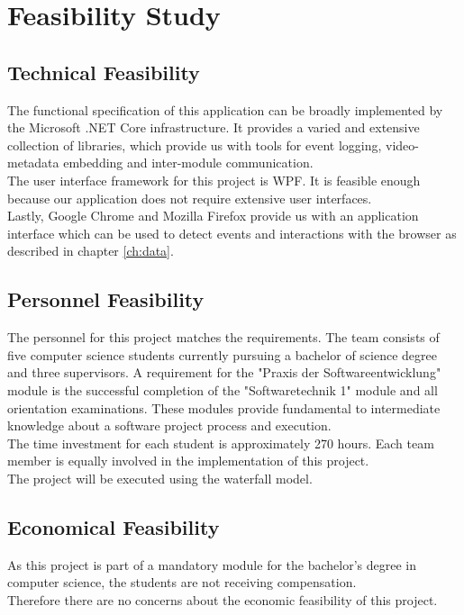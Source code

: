 \chapter{Feasibility Study}
\label{ch:feasibility}

\section{Technical Feasibility}
\label{Technical Feasibility}
The functional specification of this application can be broadly implemented by the Microsoft .NET Core infrastructure. It provides a varied and extensive collection of libraries, which provide us with tools for \gls{event} logging, video-metadata embedding and inter-module communication.\\
The user interface framework for this project is WPF. It is feasible enough because our application does not require extensive user interfaces.\\
Lastly, Google Chrome and Mozilla Firefox provide us with an application interface which can be used to detect \glspl{event} and interactions with the \gls{browser} as described in chapter \ref{ch:data}.

\section{Personnel Feasibility}
\label{Personnel Feasibility}
The personnel for this project matches the requirements. The team consists of five computer science students currently pursuing a bachelor of science degree and three supervisors. A requirement for the "Praxis der Softwareentwicklung" module is the successful completion of the "Softwaretechnik 1" module and all orientation examinations. These modules provide fundamental to intermediate knowledge about a software project process and execution.\\
The time investment for each student is approximately 270 hours. Each team member is equally involved in the implementation of this project.\\
The project will be executed using the waterfall model.

\section{Economical Feasibility}
\label{Economical Feasibility}
As this project is part of a mandatory module for the bachelor's degree in computer science, the students are not receiving compensation.\\
Therefore there are no concerns about the economic feasibility of this project.

